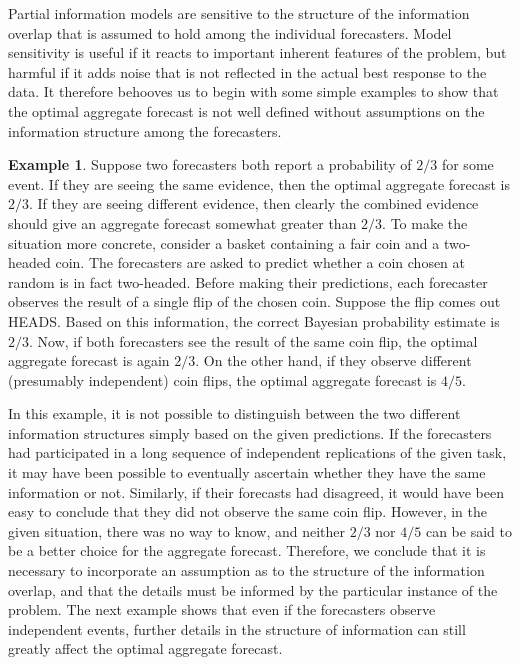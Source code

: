 \documentclass[11pt]{article}
\theoremstyle{definition}
\newtheorem{example}[theorem]{Example}
\theoremstyle{definition}
\begin{document}
Partial information models are sensitive to the structure of the
information overlap that is assumed to hold among the individual
forecasters. Model sensitivity is useful if it reacts
to important inherent features of the problem, but harmful if it adds
noise that is not reflected in the actual best response to the data.
It therefore behooves us to begin with some simple examples to show
that the optimal aggregate forecast is not well defined without
assumptions on the information structure among the forecasters.

\begin{example}
\label{FirstExample}
Suppose two forecasters both report a probability of $2/3$ for some
event.  If they are seeing the same evidence, then the optimal aggregate
forecast is $2/3$.  If they are seeing different evidence,
then clearly the combined evidence should give an aggregate forecast
somewhat greater than $2/3$.  To make the situation more concrete, consider a basket containing a fair coin and a two-headed coin. The forecasters are asked to predict whether a coin chosen at random is in fact
two-headed. Before making their predictions, each forecaster observes the result of a single flip of
the chosen coin.  Suppose the flip comes out HEADS. Based on this information, the correct Bayesian probability estimate is  $2/3$.
 Now, if both forecasters see the
result of the same coin flip, the optimal aggregate forecast
 is again $2/3$. On the other hand, if they observe different (presumably
independent) coin flips, the optimal aggregate forecast 
is $4/5$.
\end{example}
In this example, it is not possible to distinguish between the two different information structures simply based on the given predictions. If the forecasters had participated in a long sequence of independent replications of the given task, it may have been possible to eventually ascertain whether they have the same information or not. Similarly, if their forecasts had disagreed, it would have been easy to conclude that they did not observe the same coin flip.  However, in the given situation, there
was no way to know, and neither $2/3$ nor $4/5$ can be said to be a
better choice for the aggregate forecast.  Therefore, we conclude that it is necessary to incorporate an assumption as to the structure of the information
overlap, and that the details must be informed by the particular
instance of the problem. The next example shows that even if the forecasters observe independent events, further details
in the structure of information can still greatly affect the
optimal aggregate forecast.
\end{document}
